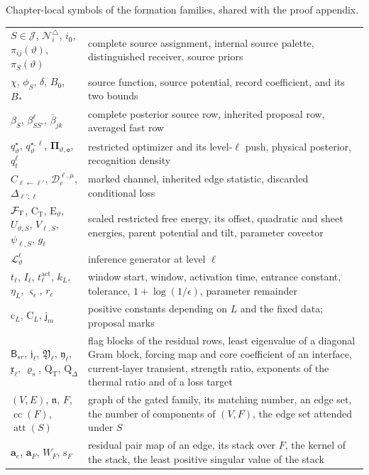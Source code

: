\begin{sciencetable}{Chapter-local symbols of the formation families, shared with the proof appendix.}
\begin{tabularx}{\textwidth}{>{\raggedright\arraybackslash}p{}>{\raggedright\arraybackslash}X}
\(S\in\mathcal J\), \(\mathcal N_i^\triangle\), \(i_0\), \(\pi_{ij}(\vartheta)\), \(\pi_S(\vartheta)\) & complete source assignment, internal source palette, distinguished receiver, source priors \\
\(\chi\), \(\phi_S\), \(\delta\), \(B_0\), \(B_*\) & source function, source potential, record coefficient, and its two bounds \\
\(\beta_S\), \(\beta^\ell_{SS'}\), \(\bar\beta_{jk}\) & complete posterior source row, inherited proposal row, averaged fast row \\
\(q^\star_\vartheta\), \(q^{\star,\ell}_\vartheta\), \(\boldsymbol\Pi_{\vartheta,\mathsf o}\), \(q^\ell_t\) & restricted optimizer and its level-\(\ell\) push, physical posterior, recognition density \\
\(C_{\ell\leftarrow\ell'}\), \(\mathcal D^{\ell,\mu}_e\), \(\Delta_{\ell':\ell}\) & marked channel, inherited edge statistic, discarded conditional loss \\
\(\mathcal F_{\mathrm T}\), \(\mathrm C_{\mathrm T}\), \(\mathrm E_\vartheta\), \(U_{\vartheta,S}\), \(V_{\ell,S}\), \(\psi_{\ell,S}\), \(g_\ell\) & scaled restricted free energy, its offset, quadratic and sheet energies, parent potential and tilt, parameter covector \\
\(\mathscr L^\ell_\vartheta\) & inference generator at level \(\ell\) \\
\(t_\ell\), \(I_\ell\), \(t^{\mathrm{act}}_\ell\), \(k_L\), \(\eta_L\), \(\varsigma_\epsilon\), \(r_\epsilon\) & window start, window, activation time, entrance constant, tolerance, \(1+\log(1/\epsilon)\), parameter remainder \\
\(\mathrm c_L\), \(\mathrm C_L\), \(\mathsf j_m\) & positive constants depending on \(L\) and the fixed data; proposal marks \\
\(\mathsf B_{sr}\), \(\mathfrak j_\ell\), \(\mathfrak Y_\ell\), \(\mathfrak y_\ell\), \(\mathfrak x_\ell\), \(\varrho_s\), \(\mathrm Q_{\mathrm T}\), \(\mathrm Q_\Delta\) & flag blocks of the residual rows, least eigenvalue of a diagonal Gram block, forcing map and core coefficient of an interface, current-layer transient, strength ratio, exponents of the thermal ratio and of a loss target \\
\((V,E)\), \(\mathfrak n\), \(F\), \(\operatorname{cc}(F)\), \(\operatorname{att}(S)\) & graph of the gated family, its matching number, an edge set, the number of components of \((V,F)\), the edge set attended under \(S\) \\
\(\mathbf a_e\), \(\mathbf a_F\), \(W_F\), \(\mathrm s_F\) & residual pair map of an edge, its stack over \(F\), the kernel of the stack, the least positive singular value of the stack \\

\end{tabularx}
\end{sciencetable}
